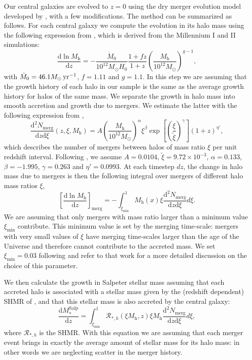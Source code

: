 \documentclass[usenatbib, letters]{mnras}
\def\mhalo{M_{\mathrm{h}}}
\def\ximin{\xi_{\mathrm{min}}}
\def\msalp{M_*^{\mathrm{Salp}}}
\begin{document}
Our central galaxies are evolved to $z=0$ using the dry merger evolution model developed by \citet{Nip++12}, with a few modifications.
The method can be summarized as follows.
For each central galaxy we compute the evolution in its halo mass  using the following expression from \citet{FMB10}, which is derived from the Millennium I and II simulations:
\begin{equation}
\frac{\mathrm{d}\ln{\mhalo}}{\mathrm{d}z} = - \frac{\dot{M}_0}{10^{12}M_\odot H_0}\frac{1 + fz}{1 + z}\left(\frac{\mhalo}{10^{12}M_\odot}\right)^{g-1},
\end{equation}
with $\dot{M}_0 = 46.1 M_\odot \rm{\, yr}^{-1}$, $f=1.11$ and $g=1.1$.
In this step we are assuming that the growth history of each halo in our sample is the same as the average growth history for halos of the same mass.
We separate the growth in halo mass into smooth accretion and growth due to mergers. We estimate the latter with the following expression from \citet{FMB10},
\begin{equation}\label{eq:nmerg}
\frac{\mathrm{d}^2N_{\mathrm{merg}}}{\mathrm{d}z \mathrm{d}\xi}(z, \xi, \mhalo) = A\left(\frac{\mhalo}{10^{12}M_\odot}\right)^\alpha \xi ^\beta \exp{\left[\left(\frac{\xi}{\tilde{\xi}}\right)^\gamma\right]}(1 + z)^{\eta'},
\end{equation}
which describes the number of mergers between halos of mass ratio $\xi$ per unit redshift interval.
Following \citet{FMB10}, we assume $A=0.0104$, $\tilde{\xi}=9.72\times10^{-3}$, $\alpha=0.133$, $\beta=-1.995$, $\gamma=0.263$ and $\eta'=0.0993$.
At each timestep $dz$, the change in halo mass due to mergers is then the following integral over mergers of different halo mass ratios $\xi$,
\begin{equation}
\left[\frac{\mathrm{d}\ln{\mhalo}}{\mathrm{d}z}\right]_{\mathrm{merg}} = -\int_{\ximin}^1 \mhalo(x)\xi \frac{\mathrm{d}^2N_{\mathrm{merg}}}{\mathrm{d}z \mathrm{d}\xi} d\xi.
\end{equation}
We are assuming that only mergers with mass ratio larger than a minimum value $\ximin$ contribute. This minimum value is set by the merging time-scale: mergers with very small values of $\xi$ have merging time-scales larger than the age of the Universe and therefore cannot contribute to the accreted mass. We set $\ximin=0.03$ following \citet{Nip++12} and refer to that work for a more detailed discussion on the choice of this parameter.

We then calculate the growth in Salpeter stellar mass assuming that each accreted halo is associated with a stellar mass given by the (redshift dependent) SHMR of \citet{Lea++12}, and that this stellar mass is also accreted by the central galaxy:
\begin{equation}
\frac{\mathrm{d}\msalp}{\mathrm{d}z} = \int_{\ximin}^1 \mathcal{R}_{*,h}(\xi \mhalo, z)\xi\mhalo\frac{\mathrm{d}^2N_{\mathrm{merg}}}{\mathrm{d}z \mathrm{d}\xi} d\xi,
\end{equation}
where $\mathcal{R}_{*,h}$ is the SHMR. With this equation we are assuming that each merger event brings in exactly the average amount of stellar mass for its halo mass: in other words we are neglecting scatter in the merger history.
\end{document}
